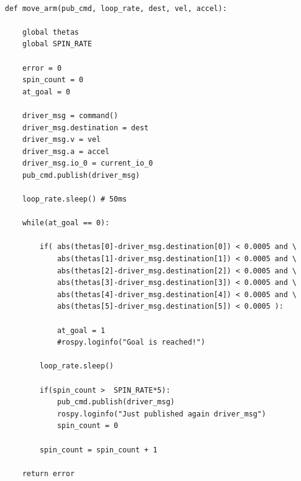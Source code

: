 {\footnotesize
\begin{verbatim}

def move_arm(pub_cmd, loop_rate, dest, vel, accel):

    global thetas
    global SPIN_RATE

    error = 0
    spin_count = 0
    at_goal = 0

    driver_msg = command()
    driver_msg.destination = dest
    driver_msg.v = vel
    driver_msg.a = accel
    driver_msg.io_0 = current_io_0
    pub_cmd.publish(driver_msg)

    loop_rate.sleep() # 50ms

    while(at_goal == 0):

        if( abs(thetas[0]-driver_msg.destination[0]) < 0.0005 and \
            abs(thetas[1]-driver_msg.destination[1]) < 0.0005 and \
            abs(thetas[2]-driver_msg.destination[2]) < 0.0005 and \
            abs(thetas[3]-driver_msg.destination[3]) < 0.0005 and \
            abs(thetas[4]-driver_msg.destination[4]) < 0.0005 and \
            abs(thetas[5]-driver_msg.destination[5]) < 0.0005 ):

            at_goal = 1
            #rospy.loginfo("Goal is reached!")
		
        loop_rate.sleep()

        if(spin_count >  SPIN_RATE*5):
            pub_cmd.publish(driver_msg)
            rospy.loginfo("Just published again driver_msg")
            spin_count = 0

        spin_count = spin_count + 1

    return error
\end{verbatim}}

